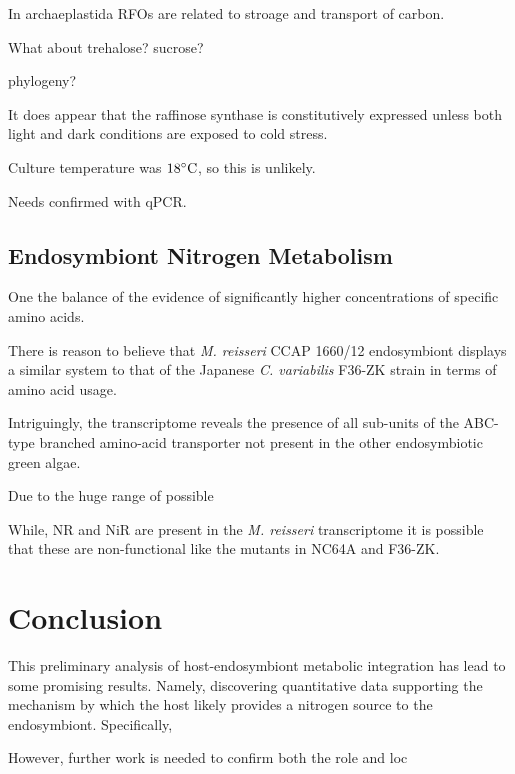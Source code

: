 In archaeplastida RFOs are related to stroage
and transport of carbon.  



What about trehalose?
sucrose?




phylogeny?





It does appear that the raffinose synthase is constitutively
expressed unless both light and dark conditions are exposed to cold stress.

Culture temperature was \(18\celsius\), so this is unlikely. 

Needs confirmed with qPCR. 





\subsection{Endosymbiont Nitrogen Metabolism}

One the balance of the evidence of significantly higher concentrations
of specific amino acids.

There is reason to believe that \textit{M. reisseri} CCAP 1660/12
endosymbiont displays a similar system to that of the Japanese
\textit{C. variabilis} F36-ZK strain in terms of amino acid usage. 

Intriguingly, the transcriptome reveals the presence of all sub-units
of the ABC-type branched amino-acid transporter not present in 
the other endosymbiotic green algae. 

Due to the huge range of possible 


While, NR and NiR are present in the \textit{M. reisseri} transcriptome
it is possible that these are non-functional like the mutants in 
NC64A and F36-ZK.




\section{Conclusion}

This preliminary analysis of host-endosymbiont metabolic integration 
has lead to some promising results.
Namely, discovering quantitative data supporting the mechanism by which
the host likely provides a nitrogen source to the endosymbiont. 
Specifically, 





However, further work is needed to confirm both the role and loc

